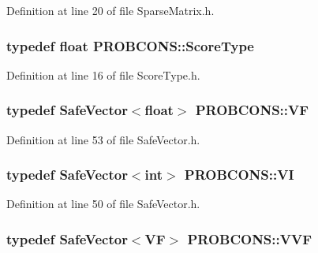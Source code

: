 Definition at line 20 of file Sparse\+Matrix.\+h.

\hypertarget{namespace_p_r_o_b_c_o_n_s_a93b8c2a0a0de0dd3d36b847946ed288c}{
\subsubsection[{Score\+Type}]{\setlength{\rightskip}{0pt plus 5cm}typedef float {\bf P\+R\+O\+B\+C\+O\+N\+S\+::\+Score\+Type}}}\label{namespace_p_r_o_b_c_o_n_s_a93b8c2a0a0de0dd3d36b847946ed288c}


Definition at line 16 of file Score\+Type.\+h.

\hypertarget{namespace_p_r_o_b_c_o_n_s_a7d46b91dfef3fa4038545a492ad12221}{
\subsubsection[{V\+F}]{\setlength{\rightskip}{0pt plus 5cm}typedef {\bf Safe\+Vector}$<$float$>$ {\bf P\+R\+O\+B\+C\+O\+N\+S\+::\+V\+F}}}\label{namespace_p_r_o_b_c_o_n_s_a7d46b91dfef3fa4038545a492ad12221}


Definition at line 53 of file Safe\+Vector.\+h.

\hypertarget{namespace_p_r_o_b_c_o_n_s_af5836390f1b6599e5a0337a7dcd4b5d7}{
\subsubsection[{V\+I}]{\setlength{\rightskip}{0pt plus 5cm}typedef {\bf Safe\+Vector}$<$int$>$ {\bf P\+R\+O\+B\+C\+O\+N\+S\+::\+V\+I}}}\label{namespace_p_r_o_b_c_o_n_s_af5836390f1b6599e5a0337a7dcd4b5d7}


Definition at line 50 of file Safe\+Vector.\+h.

\hypertarget{namespace_p_r_o_b_c_o_n_s_a64c77882f700f0f6e9426241c7d7ba1c}{
\subsubsection[{V\+V\+F}]{\setlength{\rightskip}{0pt plus 5cm}typedef {\bf Safe\+Vector}$<${\bf V\+F}$>$ {\bf P\+R\+O\+B\+C\+O\+N\+S\+::\+V\+V\+F}}}\label{namespace_p_r_o_b_c_o_n_s_a64c77882f700f0f6e9426241c7d7ba1c}


